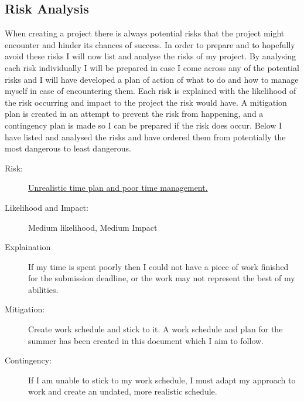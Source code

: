 \documentclass{article}
\begin{document}
\subsection{Risk Analysis}
When creating a project there is always potential risks that the project might encounter and hinder its chances of success. 
In order to prepare and to hopefully avoid these risks I will now list and analyse the risks of my project. 
By analysing each risk individually I will be prepared in case I come across any of the potential risks and I will have developed a plan of action of what to do and how to manage myself in case of encountering them. 
Each risk is explained with the likelihood of the risk occurring and impact to the project the risk would have.
A mitigation plan is created in an attempt to prevent the risk from happening, and a contingency plan is made so I can be prepared if the risk does occur.
Below I have listed and analysed the risks and have ordered them from potentially the most dangerous to least dangerous. 







\begin{description}
    \item[Risk:]    
    \underline{Unrealistic time plan and poor time management.}
    \item[Likelihood and Impact:]
    Medium likelihood, Medium Impact
    \item[Explaination]
    If my time is spent poorly then I could not have a piece of work finished for the submission deadline, or the work may not represent the best of my abilities.  
    \item[Mitigation:]
    Create work schedule and stick to it.
    A work schedule and plan for the summer has been created in this document which I aim to follow.
    \item[Contingency:]
    If I am unable to stick to my work schedule, I must adapt my approach to work and create an undated, more realistic schedule.
\end{description}
\end{document}
